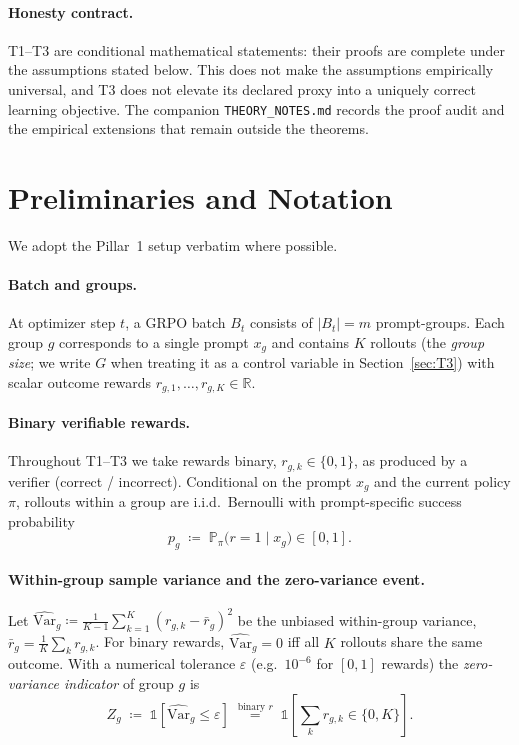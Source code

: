 \documentclass[11pt]{article}
\theoremstyle{plain}
\theoremstyle{definition}
\theoremstyle{remark}
\newcommand{\Varhat}{\ensuremath{\widehat{\mathrm{Var}}}}
\newcommand{\Prob}{\mathbb{P}}
\newcommand{\R}{\mathbb{R}}
\newcommand{\1}{\mathbb{1}}
\begin{document}
\paragraph{Honesty contract.} T1--T3 are conditional mathematical statements:
their proofs are complete under the assumptions stated below. This does not make
the assumptions empirically universal, and T3 does not elevate its declared
proxy into a uniquely correct learning objective. The companion
\texttt{THEORY\_NOTES.md} records the proof audit and the empirical extensions
that remain outside the theorems.

\section{Preliminaries and Notation}\label{sec:prelim}
We adopt the Pillar~1 setup verbatim where possible.

\paragraph{Batch and groups.} At optimizer step $t$, a GRPO batch $B_t$
consists of $|B_t| = m$ prompt-groups. Each group $g$ corresponds to a single
prompt $x_g$ and contains $K$ rollouts (the \emph{group size}; we write $G$
when treating it as a control variable in Section~\ref{sec:T3}) with scalar
outcome rewards $r_{g,1},\dots,r_{g,K} \in \R$.

\paragraph{Binary verifiable rewards.} Throughout T1--T3 we take rewards
binary, $r_{g,k}\in\{0,1\}$, as produced by a verifier (correct / incorrect).
Conditional on the prompt $x_g$ and the current policy $\pi$, rollouts within a
group are i.i.d.\ Bernoulli with prompt-specific success probability
\[
p_g \;\coloneqq\; \Prob_{\pi}\!\big(r=1 \mid x_g\big) \in [0,1].
\]

\paragraph{Within-group sample variance and the zero-variance event.} Let
$\Varhat_g \coloneqq \frac{1}{K-1}\sum_{k=1}^{K}(r_{g,k}-\bar r_g)^2$ be the
unbiased within-group variance, $\bar r_g = \frac1K\sum_k r_{g,k}$. For binary
rewards, $\Varhat_g = 0$ iff all $K$ rollouts share the same outcome. With a
numerical tolerance $\varepsilon$ (e.g.\ $10^{-6}$ for $[0,1]$ rewards) the
\emph{zero-variance indicator} of group $g$ is
\begin{equation}\label{eq:zv-indicator}
Z_g \;\coloneqq\; \1\!\left[\Varhat_g \le \varepsilon\right]
\;\overset{\text{binary } r}{=}\; \1\!\left[\textstyle\sum_k r_{g,k} \in \{0,K\}\right].
\end{equation}
\end{document}

